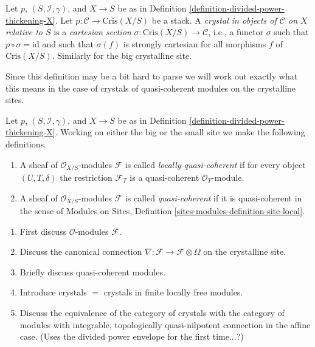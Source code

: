 \begin{definition}
\label{definition-crystal}
Let $p$, $(S, \mathcal{I}, \gamma)$, and $X \to S$ be as in
Definition \ref{definition-divided-power-thickening-X}.
Let $p : \mathcal{C} \to \text{Cris}(X/S)$ be a stack.
A {\it crystal in objects of $\mathcal{C}$ on $X$ relative to $S$}
is a {\it cartesian section} $\sigma : \text{Cris}(X/S) \to \mathcal{C}$,
i.e., a functor $\sigma$ such that $p \circ \sigma = \text{id}$
and such that $\sigma(f)$ is strongly cartesian for all
morphisms $f$ of $\text{Cris}(X/S)$. Similarly for the big crystalline site.
\end{definition}

\noindent
Since this definition may be a bit hard to parse we will work
out exactly what this means in the case of crystals of quasi-coherent
modules on the crystalline sites.


\begin{definition}
\label{definition-lqc}
Let $p$, $(S, \mathcal{I}, \gamma)$, and $X \to S$ be as in
Definition \ref{definition-divided-power-thickening-X}.
Working on either the big or the small site we make the following
definitions.
\begin{enumerate}
\item A sheaf of $\mathcal{O}_{X/S}$-modules $\mathcal{F}$
is called {\it locally quasi-coherent} if for every object
$(U, T, \delta)$ the restriction $\mathcal{F}_T$ is a quasi-coherent
$\mathcal{O}_T$-module.
\item A sheaf of $\mathcal{O}_{X/S}$-modules $\mathcal{F}$
is called {\it quasi-coherent} if it is quasi-coherent in the
sense of
Modules on Sites, Definition \ref{sites-modules-definition-site-local}.
\end{enumerate}
\end{definition}

\begin{enumerate}
\item First discuss $\mathcal{O}$-modules $\mathcal{F}$.
\item Discuss the canonical connection
$\nabla : \mathcal{F} \to \mathcal{F} \otimes \Omega$
on the crystalline site.
\item Briefly discuss quasi-coherent modules.
\item Introduce crystals $=$ crystals in finite locally free modules.
\item Discuss the equivalence of the category of crystals with the
category of modules with integrable, topologically quasi-nilpotent
connection in the affine case. (Uses the divided power envelope for the
first time...?)
\end{enumerate}






